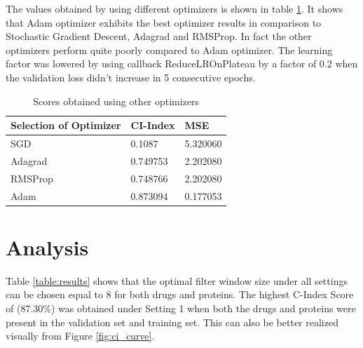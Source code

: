 The values obtained by using different optimizers is shown in table \ref{table:optimizer}. It shows that Adam optimizer exhibits the best optimizer results in comparison to Stochastic Gradient Descent, Adagrad and RMSProp. In fact the other optimizers perform quite poorly compared to Adam optimizer. The learning factor was lowered by using callback ReduceLROnPlateau by a factor of 0.2 when the validation loss didn't increase in 5 consecutive epochs.

\begin{table} [H]
    \centering
    \caption[Scores of different Optimizer] {Scores obtained using other optimizers}
    \label{table:optimizer}
    \begin{tabular}{|l|l|l|}
        \hline
        
        Selection of Optimizer & CI-Index & MSE \\ \toprule 
        
        \hline
        SGD & 0.1087 & 5.320060 \\ \hline
        Adagrad & 0.749753 & 2.202080 \\ \hline
        RMSProp & 0.748766 & 2.202080 \\ \hline
        Adam    & 0.873094 & 0.177053 \\ \hline
        
    \end{tabular}
    
\end{table}

\section{Analysis}
Table \ref{table:results} shows that the optimal filter window size under all settings can be chosen equal to 8 for both drugs and proteins. The highest C-Index Score of (87.30\%) was obtained under Setting 1 when both the drugs and proteins were present in the validation set and training set. This can also be better realized visually from Figure \ref{fig:ci_curve}.
 
